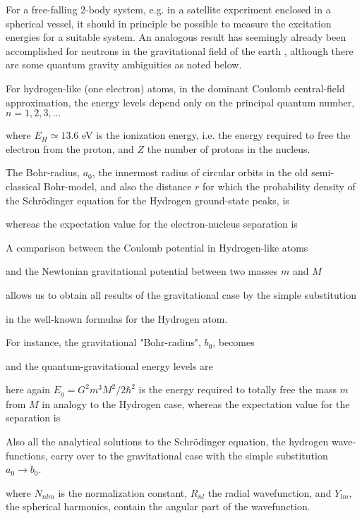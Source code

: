 	For a free-falling 2-body system, e.g. in a satellite experiment
	enclosed in a spherical vessel, it should in principle be possible
	to measure the excitation energies for a suitable system. An
	analogous result has seemingly already been accomplished for
	neutrons in the gravitational field of the earth
	\cite{Nezvishevsky}, although there are some quantum gravity
	ambiguities as noted below.
	
	For hydrogen-like (one electron) atoms, in the dominant Coulomb
	central-field approximation, the energy levels depend only on the
	principal quantum number, $n = 1, 2, 3, ...$
	
	where $E_H \simeq 13.6$ eV is the ionization energy, i.e. the
	energy required to free the electron from the proton, and $Z$ the
	number of protons in the nucleus.
	
	The Bohr-radius, $a_0$, the innermost radius of circular orbits in
	the old semi-classical Bohr-model, and also the distance $r$ for
	which the probability density of the Schr\"{o}dinger equation for
	the Hydrogen ground-state peaks, is
	
	whereas the expectation value for the electron-nucleus separation
	is
	
	A comparison between the Coulomb potential in Hydrogen-like atoms
	
	and the Newtonian gravitational potential between two masses $m$
	and $M$
	
	allows us to obtain all results of the gravitational case by the
	simple substitution
	
	in the well-known formulas for the Hydrogen atom.
	
	For instance, the gravitational "Bohr-radius", $b_0$, becomes
	
	and the quantum-gravitational energy levels are
	
	here again $E_g = G^2 m^3 M^2/ 2 \hbar^2$ is the energy required
	to totally free the mass $m$ from $M$ in analogy to the Hydrogen
	case, whereas the expectation value for the separation is
	
	Also all the analytical solutions to the Schr\"{o}dinger equation,
	the hydrogen wave-functions, carry over to the gravitational case
	with the simple substitution $a_0 \rightarrow b_0$.
	
	where $N_{nlm}$ is the normalization constant, $R_{nl}$ the radial
	wavefunction, and $Y_{lm}$, the spherical harmonics, contain the
	angular part of the wavefunction.
	
